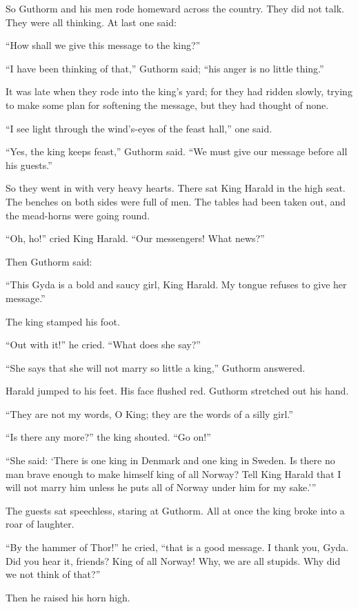 So Guthorm and his men rode homeward across the country. They did not
talk. They were all thinking. At last one said:

``How shall we give this message to the king?''

``I have been thinking of that,'' Guthorm said; ``his anger is no little
thing.''

It was late when they rode into the king's yard; for they had ridden
slowly, trying to make some plan for softening the message, but they had
thought of none.

``I see light through the wind's-eyes of the feast hall,'' one said.

``Yes, the king keeps feast,'' Guthorm said. ``We must give our message
before all his guests.''

So they went in with very heavy hearts. There sat King Harald in the
high seat. The benches on both sides were full of men. The tables had
been taken out, and the mead-horns were going round.

``Oh, ho!'' cried King Harald. ``Our messengers! What news?''

Then Guthorm said:

``This Gyda is a bold and saucy girl, King Harald. My tongue refuses to
give her message.''

The king stamped his foot.

``Out with it!'' he cried. ``What does she say?''

``She says that she will not marry so little a king,'' Guthorm answered.

Harald jumped to his feet. His face flushed red. Guthorm stretched out
his hand.

``They are not my words, O King; they are the words of a silly girl.''

``Is there any more?'' the king shouted. ``Go on!''

``She said: `There is one king in Denmark and one king in Sweden. Is
there no man brave enough to make himself king of all Norway? Tell King
Harald that I will not marry him unless he puts all of Norway under him
for my sake.'''

The guests sat speechless, staring at Guthorm. All at once the king
broke into a roar of laughter.

``By the hammer of Thor!'' he cried, ``that is a good message. I thank
you, Gyda. Did you hear it, friends? King of all Norway! Why, we are all
stupids. Why did we not think of that?''

Then he raised his horn high.

